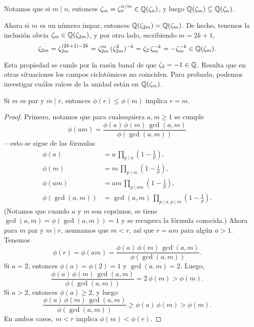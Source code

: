 Notamos que si $m \mid n$, entonces $\zeta_m = \zeta_n^{n/m} \in \mathbb{Q} (\zeta_n)$,
y luego $\mathbb{Q} (\zeta_m) \subseteq \mathbb{Q} (\zeta_n)$.

Ahora si $m$ es un número impar, entonces $\mathbb{Q} (\zeta_{2m}) = \mathbb{Q} (\zeta_m)$.
De hecho, tenemos la inclusión obvia $\zeta_m \in \mathbb{Q} (\zeta_{2m})$, y por otro
lado, escribiendo $m = 2k + 1$,
\[ \zeta_{2m} = \zeta_{2m}^{(2k+1) - 2k}
             = \zeta_{2m}^{m}\,(\zeta_{2m}^2)^{-k}
             = \zeta_2\,\zeta_m^{-k}
             = -\zeta_m^{-k} \in \mathbb{Q} (\zeta_m). \]

Esta propiedad se cumle por la razón banal de que
$\zeta_2 = -1 \in \mathbb{Q}$. Resulta que en otras situaciones los campos ciclotómicos
no coinciden. Para probarlo, podemos investigar cuáles raíces de la unidad están
en $\mathbb{Q} (\zeta_m)$.

\begin{lema}
  \label{lema:phi-de-Euler}
  Si $m$ es par y $m\mid r$, entonces $\phi (r) \le \phi (m)$ implica $r = m$.

  \begin{proof}
    Primero, notamos que para cualesquiera $a,m \ge 1$ se cumple
    $$\phi (am) = \frac{\phi (a)\,\phi (m)\,\gcd (a,m)}{\phi (\gcd (a,m))}$$
    ---esto se sigue de las fórmulas
    \begin{align*}
      \phi (a) & = a\,\prod_{p\mid a} \left(1 - \frac{1}{p}\right),\\
      \phi (m) & = m\,\prod_{p\mid m} \left(1 - \frac{1}{p}\right),\\
      \phi (am) & = am\,\prod_{p\mid am} \left(1 - \frac{1}{p}\right),\\
      \phi (\gcd (a,m)) & = \gcd (a,m)\,\prod_{p \mid a, p \mid m} \left(1 - \frac{1}{p}\right).
    \end{align*}
    (Notamos que cuando $a$ y $m$ son coprimos, se tiene
    $\gcd (a,m) = \phi (\gcd (a,m)) = 1$ y se recupera la fórmula conocida.)
    Ahora para $m$ par y $m\mid r$, asumamos que $m < r$, así que $r = am$ para
    algún $a > 1$. Tenemos
    \[ \phi (r) = \phi (am) =
       \frac{\phi (a)\,\phi(m)\,\gcd (a,m)}{\phi (\gcd (a,m))}. \]
    Si $a = 2$, entonces $\phi (a) = \phi (2) = 1$ y $\gcd (a,m) = 2$. Luego,
    \[ \frac{\phi (a)\,\phi(m)\,\gcd (a,m)}{\phi (\gcd (a,m))} =
       2\,\phi(m) > \phi (m). \]
    Si $a > 2$, entonces $\phi (a) \ge 2$, y luego
    \[ \frac{\phi (a)\,\phi(m)\,\gcd (a,m)}{\phi (\gcd (a,m))} \ge
       \phi (a)\,\phi(m) > \phi (m). \]
    En ambos casos, $m < r$ implica $\phi (m) < \phi (r)$.
  \end{proof}
\end{lema}

